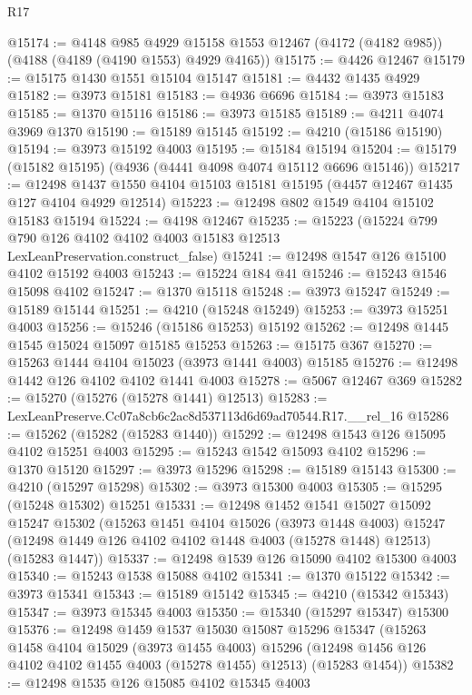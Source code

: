 \begin{lexlean}{R17}
\begin{coremodule}
@15174 := @4148
    @985
    @4929
    @15158
    @1553
    @12467
    (@4172 (@4182 @985))
    (@4188 (@4189 (@4190 @1553) @4929 @4165))
@15175 := @4426 @12467
@15179 := @15175 @1430 @1551 @15104 @15147
@15181 := @4432 @1435 @4929
@15182 := @3973 @15181
@15183 := @4936 @6696
@15184 := @3973 @15183
@15185 := @1370 @15116
@15186 := @3973 @15185
@15189 := @4211 @4074 @3969 @1370
@15190 := @15189 @15145
@15192 := @4210 (@15186 @15190)
@15194 := @3973 @15192 @4003
@15195 := @15184 @15194
@15204 := @15179 (@15182 @15195) (@4936 (@4441 @4098 @4074 @15112 @6696 @15146))
@15217 := @12498 @1437 @1550 @4104 @15103 @15181 @15195 (@4457 @12467 @1435 @127 @4104 @4929 @12514)
@15223 := @12498 @802 @1549 @4104 @15102 @15183 @15194
@15224 := @4198 @12467
@15235 := @15223
    (@15224 @799 @790 @126 @4102 @4102 @4003 @15183 @12513 LexLeanPreservation.construct_false)
@15241 := @12498 @1547 @126 @15100 @4102 @15192 @4003
@15243 := @15224 @184 @41
@15246 := @15243 @1546 @15098 @4102
@15247 := @1370 @15118
@15248 := @3973 @15247
@15249 := @15189 @15144
@15251 := @4210 (@15248 @15249)
@15253 := @3973 @15251 @4003
@15256 := @15246 (@15186 @15253) @15192
@15262 := @12498 @1445 @1545 @15024 @15097 @15185 @15253
@15263 := @15175 @367
@15270 := @15263 @1444 @4104 @15023 (@3973 @1441 @4003) @15185
@15276 := @12498 @1442 @126 @4102 @4102 @1441 @4003
@15278 := @5067 @12467 @369
@15282 := @15270 (@15276 (@15278 @1441) @12513)
@15283 := LexLeanPreserve.Cc07a8cb6c2ac8d537113d6d69ad70544.R17.__rel_16
@15286 := @15262 (@15282 (@15283 @1440))
@15292 := @12498 @1543 @126 @15095 @4102 @15251 @4003
@15295 := @15243 @1542 @15093 @4102
@15296 := @1370 @15120
@15297 := @3973 @15296
@15298 := @15189 @15143
@15300 := @4210 (@15297 @15298)
@15302 := @3973 @15300 @4003
@15305 := @15295 (@15248 @15302) @15251
@15331 := @12498
    @1452
    @1541
    @15027
    @15092
    @15247
    @15302
    (@15263
      @1451
      @4104
      @15026
      (@3973 @1448 @4003)
      @15247
      (@12498 @1449 @126 @4102 @4102 @1448 @4003 (@15278 @1448) @12513)
      (@15283 @1447))
@15337 := @12498 @1539 @126 @15090 @4102 @15300 @4003
@15340 := @15243 @1538 @15088 @4102
@15341 := @1370 @15122
@15342 := @3973 @15341
@15343 := @15189 @15142
@15345 := @4210 (@15342 @15343)
@15347 := @3973 @15345 @4003
@15350 := @15340 (@15297 @15347) @15300
@15376 := @12498
    @1459
    @1537
    @15030
    @15087
    @15296
    @15347
    (@15263
      @1458
      @4104
      @15029
      (@3973 @1455 @4003)
      @15296
      (@12498 @1456 @126 @4102 @4102 @1455 @4003 (@15278 @1455) @12513)
      (@15283 @1454))
@15382 := @12498 @1535 @126 @15085 @4102 @15345 @4003

\end{coremodule}
\end{lexlean}
